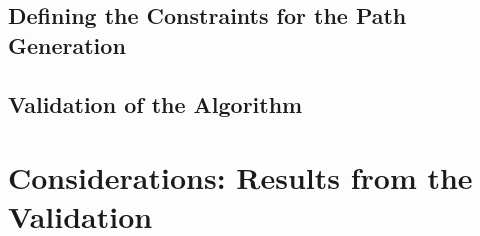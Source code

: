 \subsection{Defining the Constraints for the Path Generation}
\subsection{Validation of the Algorithm}
\section{Considerations: Results from  the Validation}


